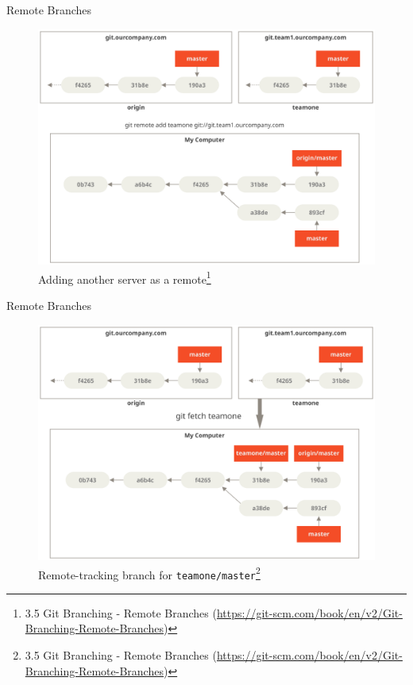 \documentclass[aspectratio=169]{beamer}
\newcommand{\sectiontitle}{}
\begin{document}
\begin{frame}{Remote Branches}{\sectiontitle}
\begin{figure}
    \centering
    \includegraphics[width=\textwidth,height=0.5\textheight,keepaspectratio]{remote-branches-4}
    \caption{
        Adding another server as a remote\footnote{
            3.5 Git Branching - Remote Branches
            (\url{https://git-scm.com/book/en/v2/Git-Branching-Remote-Branches})
        }
    }
\end{figure}
\end{frame}

\begin{frame}{Remote Branches}{\sectiontitle}
\begin{figure}
    \centering
    \includegraphics[width=\textwidth,height=0.5\textheight,keepaspectratio]{remote-branches-5}
    \caption{
        Remote-tracking branch for \texttt{teamone/master}\footnote{
            3.5 Git Branching - Remote Branches
            (\url{https://git-scm.com/book/en/v2/Git-Branching-Remote-Branches})
        }
    }
\end{figure}
\end{frame}
\end{document}
